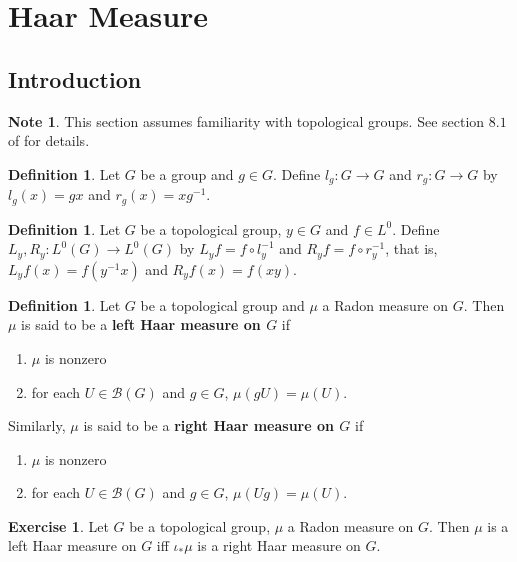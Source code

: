 \documentclass[12pt]{amsart}
\theoremstyle{definition}
\newtheorem{defn}[definition]{Definition}
\newtheorem{note}[definition]{Note}
\newtheorem{ex}[definition]{Exercise}
\newcommand{\MB}{\mathcal{B}}
\newcommand{\lex}[1]{\label{ex:#1}}
\newcommand{\ld}[1]{\label{defn:#1}}
\begin{document}
	\newpage
	\section{Haar Measure}
	
	\subsection{Introduction}
	
	\begin{note}
	This section assumes familiarity with topological groups. See section $8.1$ of \cite{analysis} for details. 
	\end{note}

	\begin{defn} \ld{00000} 
		Let $G$ be a group and $g \in G$. Define $l_g:G \rightarrow G$ and $r_g:G \rightarrow G$ by $l_g(x) = gx$ and $r_g(x) = xg^{-1}$. 
	\end{defn}

	\begin{defn} \ld{00000} 
		Let $G$ be a topological group, $y \in G$ and $f \in L^0$.  Define $L_y, R_y: L^0(G) \rightarrow L^0(G)$ by $L_y f = f \circ l_y^{-1}$ and $R_y f = f \circ r_y^{-1}$, that is, $L_yf(x) = f(y^{-1}x)$ and $R_yf(x) = f(xy)$.
	\end{defn}
	
	\begin{defn} \ld{00000} 
		Let $G$ be a topological group and $\mu$ a Radon measure on $G$. Then $\mu$ is said to be a \textbf{left Haar measure on $G$} if 
		\begin{enumerate}
			\item $\mu$ is nonzero  
			\item for each $U \in \MB(G)$ and $g \in G$, $\mu(gU) = \mu(U)$.  
		\end{enumerate}
		Similarly, $\mu$ is said to be a \textbf{right Haar measure on $G$} if 
		\begin{enumerate}
			\item $\mu$ is nonzero  
			\item for each $U \in \MB(G)$ and $g \in G$, $\mu(Ug) = \mu(U)$.  
		\end{enumerate}
	\end{defn}
	
	\begin{ex} \lex{00000} 
		Let $G$ be a topological group, $\mu$ a Radon measure on $G$. Then $\mu$ is a left Haar measure on $G$ iff $\iota_*\mu$ is a right Haar measure on $G$. 
	\end{ex}
	
\end{document}
